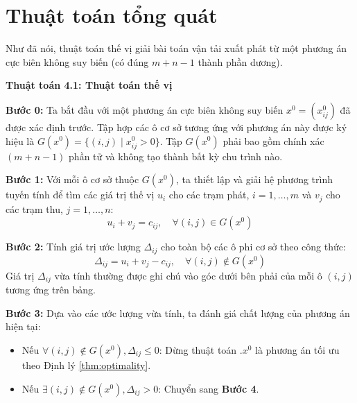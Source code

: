 \documentclass[../main.tex]{subfiles}
\begin{document}
\section{Thuật toán tổng quát}

Như đã nói, thuật toán thế vị giải bài toán vận tải xuất phát từ một phương án cực biên không suy biến (có đúng $m+n-1$ thành phần dương).

\textbf{Thuật toán 4.1: Thuật toán thế vị}

\textbf{Bước 0:} 
Ta bắt đầu với một phương án cực biên không suy biến $x^0 = (x^0_{ij})$ đã được xác định trước. Tập hợp các ô cơ sở tương ứng với phương án này được ký hiệu là $G(x^0) = \{(i,j) \mid x^0_{ij} > 0\}$. Tập $G(x^0)$ phải bao gồm chính xác $(m+n-1)$ phần tử và không tạo thành bất kỳ chu trình nào.

\textbf{Bước 1:} 
Với mỗi ô cơ sở thuộc $G(x^0)$, ta thiết lập và giải hệ phương trình tuyến tính để tìm các giá trị thế vị $u_i$ cho các trạm phát, $i = 1, \dots, m$ và $v_j$ cho các trạm thu, $j = 1, \dots, n$:
\[ u_i + v_j = c_{ij}, \quad \forall (i,j) \in G(x^0) \]

\textbf{Bước 2:} 
Tính giá trị ước lượng $\Delta_{ij}$ cho toàn bộ các ô phi cơ sở theo công thức:
\[ \Delta_{ij} = u_i + v_j - c_{ij}, \quad \forall (i,j) \notin G(x^0) \]
Giá trị $\Delta_{ij}$ vừa tính thường được ghi chú vào góc dưới bên phải của mỗi ô $(i,j)$ tương ứng trên bảng.

\textbf{Bước 3:} 
Dựa vào các ước lượng vừa tính, ta đánh giá chất lượng của phương án hiện tại:
\begin{itemize}
    \item Nếu $\forall (i,j) \notin G(x^0), \Delta_{ij} \le 0$: Dừng thuật toán .$x^0$ là phương án tối ưu theo Định lý \ref{thm:optimality}.
    \item Nếu $\exists (i,j) \notin G(x^0), \Delta_{ij} > 0$: Chuyển sang \textbf{Bước 4}.
\end{itemize}
\end{document}
